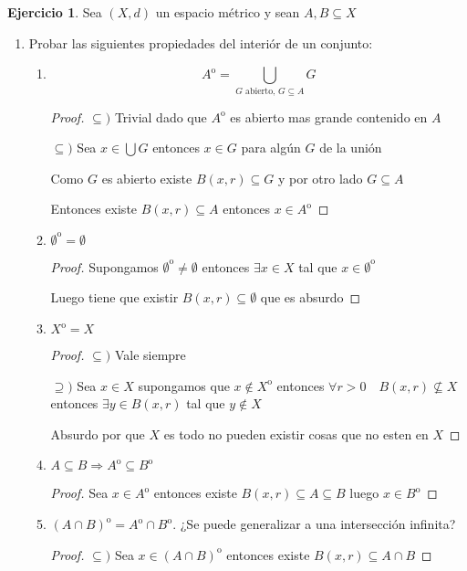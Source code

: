 \documentclass[12pt]{article}
\newcommand{\Ra}{\Rightarrow}
\newcommand{\open}{\mathrm{o}}
\theoremstyle{definition}
\newtheorem{ej}{Ejercicio}
\begin{document}
\begin{ej}
  Sea $(X,d)$ un espacio métrico y sean $A,B \subseteq X$
  \begin{enumerate}
    \item Probar las siguientes propiedades del interiór de un conjunto:
      \begin{enumerate}
	\item $$A^{\open} = \bigcup_{G \text{ abierto, } G \subseteq A} G$$
	  \begin{proof}
	  $\subseteq )$ Trivial dado que $A^{\open}$ es abierto mas grande contenido en  $A$
	  
	$\subseteq ) $ Sea $x \in \bigcup G$ entonces $x \in G$ para algún $G$ de la unión

	Como $G$ es abierto existe $B(x,r) \subseteq G$ y por otro lado $G \subseteq A$

	Entonces existe $B(x,r) \subseteq A$ entonces $x \in A^{\open}$
	  \end{proof}
	\item $\emptyset^{\open} = \emptyset$
	  \begin{proof}
	    Supongamos $\emptyset^{\open} \neq \emptyset$ entonces $\exists x \in X$ tal que $x \in \emptyset^{\open}$

	    Luego tiene que existir $B(x,r) \subseteq \emptyset$ que es absurdo
	  \end{proof}
	\item $X^{\open} = X$
	  \begin{proof}
	  $\subseteq )$ Vale siempre

	$\supseteq )$ Sea $x \in X$ supongamos que $x \notin X^{\open}$ entonces $\forall r>0 \quad B(x,r) \not\subseteq X$ entonces $\exists y \in B(x,r)$ tal que $y \notin X$

	Absurdo por que $X$ es todo no pueden existir cosas que no esten en $X$
	  \end{proof}
	  \newpage
	\item $A \subseteq B \Ra A^{\open} \subseteq B^{\open}$
	  \begin{proof}
	    Sea $x \in A^{\open}$ entonces existe $B(x,r) \subseteq A \subseteq B$ luego $x \in B^{\open}$
	  \end{proof}
	\item $(A \cap B)^{\open} = A^{\open} \cap B^{\open}.$ ¿Se puede generalizar a una intersección infinita?
	  \begin{proof}
	  $\subseteq )$ Sea $x \in (A \cap B)^{\open}$ entonces existe $B(x,r) \subseteq A \cap B$


\end{proof}
\end{enumerate}
\end{enumerate}
\end{ej}
\end{document}
